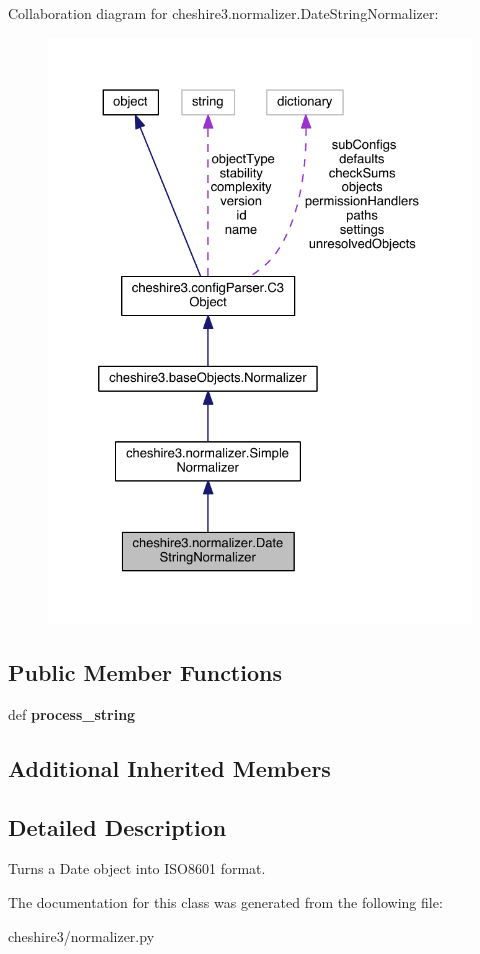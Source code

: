 Collaboration diagram for cheshire3.\-normalizer.\-Date\-String\-Normalizer\-:
\nopagebreak
\begin{figure}[H]
\begin{center}
\leavevmode
\includegraphics[width=328pt]{classcheshire3_1_1normalizer_1_1_date_string_normalizer__coll__graph}
\end{center}
\end{figure}
\subsection*{Public Member Functions}
\begin{DoxyCompactItemize}
\item 
\hypertarget{classcheshire3_1_1normalizer_1_1_date_string_normalizer_a83f7922a907f2867d8fbd9f18b0ed4fd}{def {\bfseries process\-\_\-string}}\label{classcheshire3_1_1normalizer_1_1_date_string_normalizer_a83f7922a907f2867d8fbd9f18b0ed4fd}

\end{DoxyCompactItemize}
\subsection*{Additional Inherited Members}


\subsection{Detailed Description}
\begin{DoxyVerb}Turns a Date object into ISO8601 format.\end{DoxyVerb}
 

The documentation for this class was generated from the following file\-:\begin{DoxyCompactItemize}
\item 
cheshire3/normalizer.\-py\end{DoxyCompactItemize}
